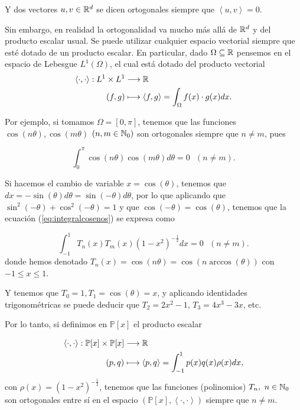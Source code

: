 Y dos vectores $u,v\in\mathbb{R}^d$ se dicen ortogonales siempre que $\left\langle u, v \right\rangle=0$.

Sin embargo, en realidad la ortogonalidad va mucho más allá de $\mathbb{R}^d$ y del producto escalar usual. Se puede utilizar cualquier espacio vectorial siempre que esté dotado de un producto escalar. En particular, dado $\Omega\subseteq \mathbb{R}$ pensemos en el espacio de Lebesgue $L^1(\Omega)$, el cual está dotado del producto vectorial
\begin{equation*}
    \begin{split}
        \left\langle\cdot,\cdot\right\rangle:L^1\times L^1 &\longrightarrow \mathbb{R} \\
        (f,g)&\longmapsto \left\langle f,g \right\rangle=\int_{\Omega}f(x)\cdot g(x)dx .
    \end{split}
\end{equation*}

Por ejemplo, si tomamos $\Omega = [0,\pi]$, tenemos que las funciones $\cos(n\theta), \cos(m\theta)$  $(n,m\in\mathbb{N}_0)$ son ortogonales siempre que $n\not= m$, pues 

\begin{equation}
    \label{eq:integralcosenos}
    \int_0^\pi \cos(n\theta)\cos(m\theta) d\theta = 0 \ \ \ (n\not=m).
\end{equation}


Si hacemos el cambio de variable $x = \cos(\theta)$, tenemos que $dx = -\sin(\theta)d\theta=\sin(-\theta)d\theta$, por lo que aplicando que $\sin^2(-\theta)+\cos^2(-\theta)=1$ y que $\cos(-\theta)=\cos(\theta)$, tenemos que la ecuación (\ref{eq:integralcosenos}) se expresa como


\begin{equation}
    \label{eq:integralTn}
    \int_{-1}^1 T_n(x)T_m(x) (1-x^2)^{-\frac 1 2}dx = 0  \ \ \ (n\not=m).
\end{equation}
donde hemos denotado $T_n (x) = \cos(n\theta) = \cos(n\arccos(\theta))$ con $-1\leq x \leq 1$. 

Y tenemos que $T_0=1, T_1=\cos(\theta)=x$, y aplicando identidades trigonométricas se puede deducir que $T_2=2x^2 - 1$, $T_3=4x^3 - 3x$, etc.

Por lo tanto, si definimos en $\mathbb{P}[x]$ el producto escalar

\begin{equation*}
    \begin{split}
        \left\langle\cdot,\cdot\right\rangle:\mathbb{P}[x]\times \mathbb{P}[x] &\longrightarrow \mathbb{R} \\
        (p,q)&\longmapsto \left\langle p,q \right\rangle=\int_{-1}^1 p(x)q(x)\rho(x)dx,
    \end{split}
\end{equation*}
con $\rho(x)=(1-x^2)^{-\frac 1 2}$, tenemos que las funciones (polinomios) $T_n,\ n\in\N_0$ son ortogonales entre sí en el espacio $(\mathbb{P}[x], \left\langle\cdot,\cdot\right\rangle)$ siempre que $n\not=m$.

